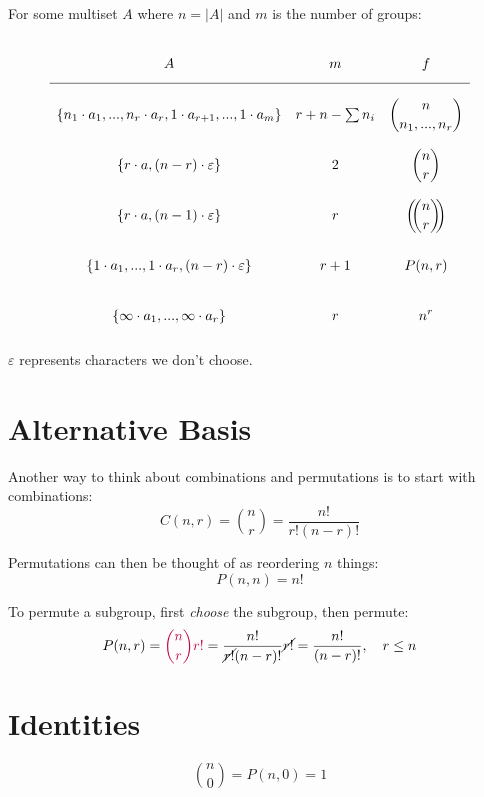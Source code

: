 \documentclass{article}
\begin{document}
    For some multiset $A$ where $n = |A|$ and $m$ is the number of groups: $$\def\arraystretch{3}
    \begin{array}{>{\displaystyle}cc>{\displaystyle}c}
        A & m & f \\
        \hline
        \{n_1 \cdot a_1, ..., n_r \cdot a_r, 1 \cdot a_{r + 1}, ..., 1 \cdot a_m\} & r + n - \sum{n_i} & {n \choose n_1, ..., n_r} \\
        \{r \cdot a, (n - r) \cdot \varepsilon\} & 2 & {n \choose r} \\
        \{r \cdot a, (n - 1) \cdot \varepsilon\} & r & \left(\!\!{n \choose r}\!\!\right) \\
        \{1 \cdot a_1, ..., 1 \cdot a_r, (n - r) \cdot \varepsilon\} & r + 1 & P(n, r) \\
        \{\infty \cdot a_1, ..., \infty \cdot a_r\} & r & n^r \\
    \end{array}$$

    $\varepsilon$ represents characters we don't choose.
    
    \section{Alternative Basis}

    Another way to think about combinations and permutations is to start with combinations: \begin{equation}
        C(n, r) = {n \choose r} = \frac{n!}{r!(n - r)!}
    \end{equation}

    Permutations can then be thought of as reordering $n$ things: \begin{equation}
        P(n, n) = n!
    \end{equation}
        
    To permute a subgroup, first \textit{choose} the subgroup, then permute: \begin{equation}
        P(n, r) = \color{purple}{n \choose r}r!\color{black} = \frac{n!}{\cancel{r!}(n - r)!}\cancel{r!} = \frac{n!}{(n - r)!}, \quad r \leq n
    \end{equation}

    \section{Identities}
    
    \begin{equation}
        {n \choose 0} = P(n, 0) = 1
    \end{equation}
\end{document}
